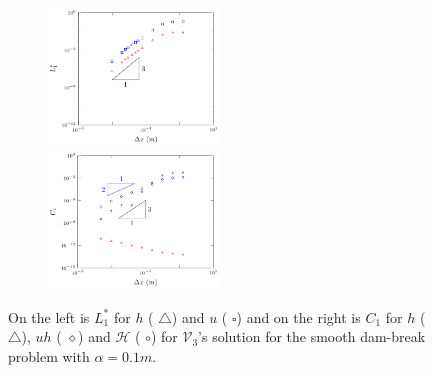 \documentclass[SingleSpace,12pt,Journal]{Serre_ASCE}
\begin{document}
\begin{figure}
	\centering
	\begin{subfigure}{\textwidth}
		\includegraphics[width=0.5\textwidth]{pics/results/SDB/Lcon/alpha10/1.pdf}
		\includegraphics[width=0.5\textwidth]{pics/results/SDB/Con/12.pdf}
	\end{subfigure}
	\caption{On the left is $L^*_1$ for $h$ ({\color{red} $\triangle$}) and $u$ ({\color{blue} $\square$}) and on the right is $C_1$ for $h$ ({\color{red} $\triangle$}), $uh$ ({\color{black} $\diamond$}) and $\mathcal{H}$ ({\color{blue} $\circ$}) for $\mathcal{V}_3$'s solution for the smooth dam-break problem with $\alpha = 0.1m$.}
	\label{fig:o3a4dxlimmeasure}
\end{figure}



\end{document}
